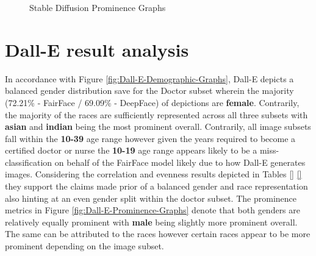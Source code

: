 \begin{figure}[H]
\centering  
{}

\caption{Stable Diffusion Prominence Graphs}\label{fig:Stable-Diffusion-Prominence-Graphs}
\end{figure}

\section{Dall-E result analysis}\label{Eval-Dall-E}

In accordance with Figure \ref{fig:Dall-E-Demographic-Graphs}, Dall-E depicts a balanced gender distribution save for the Doctor subset wherein the majority (72.21\% - FairFace / 69.09\% - DeepFace) of depictions are \textbf{female}. Contrarily, the majority of the races are sufficiently represented across all three subsets with \textbf{asian} and \textbf{indian} being the most prominent overall. Contrarily, all image subsets fall within the \textbf{10-39} age range however given the years required to become a certified doctor or nurse the \textbf{10-19} age range appears likely to be a miss-classification on behalf of the FairFace model likely due to how Dall-E generates images. Considering the correlation and evenness results depicted in Tables \ref{} \ref{} they support the claims made prior of a balanced gender and race representation also hinting at an even gender split within the doctor subset. The prominence metrics in Figure \ref{fig:Dall-E-Prominence-Graphs} denote that both genders are relatively equally prominent with \textbf{male} being slightly more prominent overall. The same can be attributed to the races however certain races appear to be more prominent depending on the image subset.

